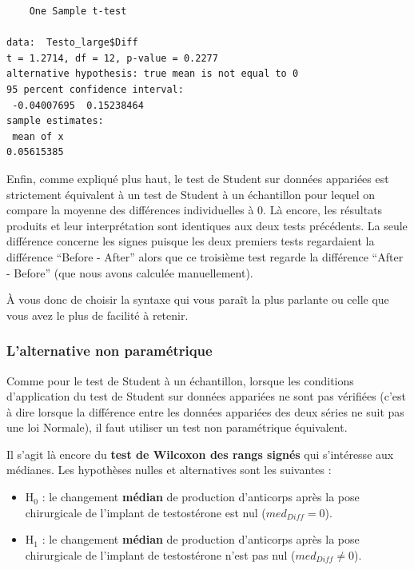 \documentclass[
  a4paper,
]{article}
\newenvironment{Shaded}{\begin{snugshade}}{\end{snugshade}}
\newcommand{\AttributeTok}[1]{\textcolor[rgb]{0.00,0.34,0.68}{#1}}
\newcommand{\CommentTok}[1]{\textcolor[rgb]{0.54,0.53,0.53}{#1}}
\newcommand{\DecValTok}[1]{\textcolor[rgb]{0.69,0.50,0.00}{#1}}
\newcommand{\FunctionTok}[1]{\textcolor[rgb]{0.39,0.29,0.61}{#1}}
\newcommand{\NormalTok}[1]{\textcolor[rgb]{0.12,0.11,0.11}{#1}}
\newcommand{\SpecialCharTok}[1]{\textcolor[rgb]{0.24,0.68,0.91}{#1}}
\providecommand{\tightlist}{%
  \setlength{\itemsep}{0pt}\setlength{\parskip}{0pt}}
\begin{document}
\begin{Shaded}
\end{Shaded}

\begin{verbatim}
    One Sample t-test

data:  Testo_large$Diff
t = 1.2714, df = 12, p-value = 0.2277
alternative hypothesis: true mean is not equal to 0
95 percent confidence interval:
 -0.04007695  0.15238464
sample estimates:
 mean of x 
0.05615385 
\end{verbatim}

Enfin, comme expliqué plus haut, le test de Student sur données appariées est strictement équivalent à un test de Student à un échantillon pour lequel on compare la moyenne des différences individuelles à 0. Là encore, les résultats produits et leur interprétation sont identiques aux deux tests précédents. La seule différence concerne les signes puisque les deux premiers tests regardaient la différence ``Before - After'' alors que ce troisième test regarde la différence ``After - Before'' (que nous avons calculée manuellement).

À vous donc de choisir la syntaxe qui vous paraît la plus parlante ou celle que vous avez le plus de facilité à retenir.

\hypertarget{lalternative-non-paramuxe9trique-1}{%
\subsubsection{L'alternative non paramétrique}\label{lalternative-non-paramuxe9trique-1}}

Comme pour le test de Student à un échantillon, lorsque les conditions d'application du test de Student sur données appariées ne sont pas vérifiées (c'est à dire lorsque la différence entre les données appariées des deux séries ne suit pas une loi Normale), il faut utiliser un test non paramétrique équivalent.

Il s'agit là encore du \textbf{test de Wilcoxon des rangs signés} qui s'intéresse aux médianes. Les hypothèses nulles et alternatives sont les suivantes :

\begin{itemize}
\tightlist
\item
  H\(_0\) : le changement \textbf{médian} de production d'anticorps après la pose chirurgicale de l'implant de testostérone est nul (\(med_{Diff} = 0\)).
\item
  H\(_1\) : le changement \textbf{médian} de production d'anticorps après la pose chirurgicale de l'implant de testostérone n'est pas nul (\(med_{Diff} \neq 0\)).
\end{itemize}
\end{document}
